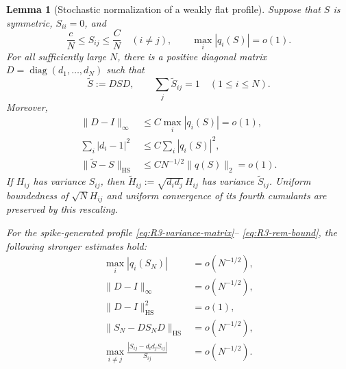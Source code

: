 \documentclass[10pt,a4paper]{amsart}
\newtheorem{lemma}[theorem]{Lemma}
\newcommand{\diag}{\operatorname{diag}}
\newcommand{\HS}{\mathrm{HS}}
\newcommand{\norm}[1]{\lVert #1\rVert}
\begin{document}
\begin{lemma}[Stochastic normalization of a weakly flat profile]
\label{lem:R3-stochastic-normalization}
Suppose that \(S\) is symmetric, \(S_{ii}=0\), and
\[
 \frac{c}{N}\le S_{ij}\le\frac{C}{N}\quad(i\ne j),
 \qquad \max_i|q_i(S)|=o(1).
\]
For all sufficiently large \(N\), there is a positive diagonal matrix
\(D=\diag(d_1,\ldots,d_N)\) such that
\begin{equation}\label{eq:R3-balanced-profile}
 \widetilde S:=DSD,
 \qquad
 \sum_j\widetilde S_{ij}=1\quad(1\le i\le N).
\end{equation}
Moreover,
\begin{align}
 \norm{D-I}_{\infty}
 &\le C\max_i|q_i(S)|=o(1),\label{eq:R3-D-infty}\\
 \sum_i|d_i-1|^2
 &\le C\sum_i|q_i(S)|^2,\label{eq:R3-D-l2}\\
 \norm{\widetilde S-S}_{\HS}
 &\le C N^{-1/2}\norm{q(S)}_2=o(1).
 \label{eq:R3-balanced-HS}
\end{align}
If \(H_{ij}\) has variance \(S_{ij}\), then
\(\widetilde H_{ij}:=\sqrt{d_id_j}\,H_{ij}\) has variance
\(\widetilde S_{ij}\).  Uniform boundedness of \(\sqrt N H_{ij}\) and
uniform convergence of its fourth cumulants are preserved by this rescaling.

For the spike-generated profile \eqref{eq:R3-variance-matrix}--
\eqref{eq:R3-rem-bound}, the following stronger estimates hold:
\begin{align}
 \max_i|q_i(S_N)|&=o(N^{-1/2}),
 \label{eq:R3-strong-q}\\
 \norm{D-I}_\infty&=o(N^{-1/2}),
 \label{eq:R3-strong-D-infty}\\
 \norm{D-I}_{\HS}^2&=o(1),
 \label{eq:R3-strong-D-HS}\\
 \norm{S_N-DS_ND}_{\HS}&=o(N^{-1/2}),
 \label{eq:R3-strong-profile-HS}\\
 \max_{i\ne j}\frac{|S_{ij}-d_id_jS_{ij}|}{S_{ij}}
 &=o(N^{-1/2}).
 \label{eq:R3-strong-relative}
\end{align}
\end{lemma}
\end{document}
